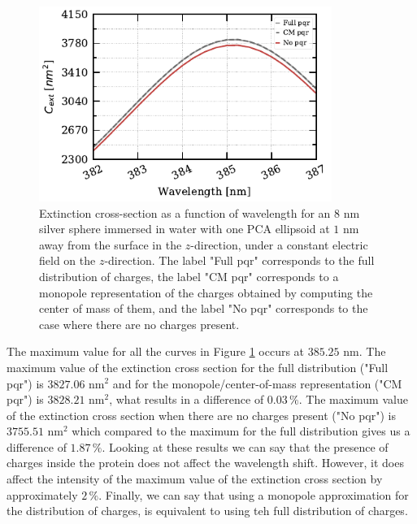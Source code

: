 \begin{figure}%
    \centering
    \includegraphics[width=0.85\textwidth]{pqr_analysis_pca.pdf} 
    \caption{Extinction cross-section as a function of wavelength for an $8$ nm
    silver sphere immersed in water with one PCA ellipsoid at $1$ nm away from 
    the surface in the $z$-direction, under a constant electric field on the $z$-direction.
    The label "Full pqr" corresponds to the full distribution of charges, the label "CM pqr" corresponds to a monopole representation 
    of the charges obtained by computing the center of mass of them, and the label "No pqr" 
    corresponds to the case where there are no charges present.}
    \label{fig:pqr_pca}
 \end{figure}

 The maximum value for all the curves in Figure \ref{fig:pqr_pca} occurs at $385.25$ nm. The 
 maximum value of the extinction cross section for the full distribution ("Full pqr") is $3827.06$ nm$^2$ and for 
 the monopole/center-of-mass representation ("CM pqr") is $3828.21$ nm$^2$, what results in a difference of $0.03 \,\%$. The
 maximum value of the extinction cross section when there are no charges present ("No pqr") is $3755.51$ nm$^2$ which compared to 
 the maximum for the full distribution gives us a difference of $1.87 \,\%$. Looking at these results we can say that the presence of 
 charges inside the protein does not affect the wavelength shift. However, it does affect the intensity of the maximum value of the 
 extinction cross section by approximately $2 \,\%$. Finally, we can say that using a monopole approximation for the distribution of charges, 
 is equivalent to using teh full distribution of charges.
